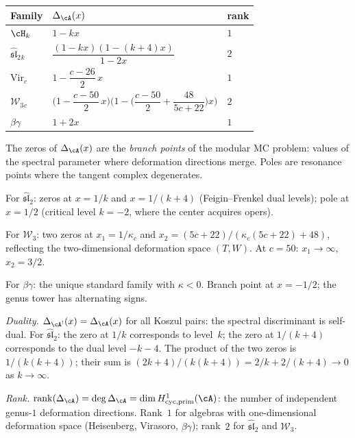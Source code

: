 \begin{computation}
\label{comp:spectral-discriminants-standard}
\begin{center}
\renewcommand{\arraystretch}{1.3}
\begin{tabular}{lll}
\textbf{Family} & $\Delta_\cA(x)$ & rank \\
\hline
$\cH_k$ & $1-kx$ & $1$ \\[2pt]
$\widehat{\mathfrak{sl}}_2{}_k$ &
 $\dfrac{(1-kx)(1-(k{+}4)x)}{1-2x}$ & $2$ \\[6pt]
$\mathrm{Vir}_c$ &
 $1-\dfrac{c-26}{2}\,x$ & $1$ \\[6pt]
$\mathcal W_3{}_c$ &
 $\bigl(1-\dfrac{c-50}{2}\,x\bigr)
 \bigl(1-\bigl(\dfrac{c-50}{2}+\dfrac{48}{5c+22}\bigr)x\bigr)$
 & $2$ \\[6pt]
$\beta\gamma$ & $1+2x$ & $1$
\end{tabular}
\end{center}
The zeros of $\Delta_\cA(x)$ are the \emph{branch points}
of the modular MC problem: values of the spectral parameter
where deformation directions merge. Poles are resonance
points where the tangent complex degenerates.

For $\widehat{\mathfrak{sl}}_2$: zeros at $x=1/k$ and
$x=1/(k{+}4)$ (Feigin--Frenkel dual levels); pole at $x=1/2$
(critical level $k=-2$, where the center acquires opers).

For $\mathcal W_3$: two zeros at $x_1=1/\kappa_c$ and
$x_2=(5c{+}22)/(\kappa_c(5c{+}22){+}48)$, reflecting the
two-dimensional deformation space $(T,W)$. At $c=50$:
$x_1\to\infty$, $x_2=3/2$.

For $\beta\gamma$: the unique standard family with
$\kappa<0$. Branch point at $x=-1/2$; the genus tower has
alternating signs.

\emph{Duality.}
$\Delta_{\cA^!}(x)=\Delta_\cA(x)$ for all Koszul pairs:
the spectral discriminant is self-dual. For
$\widehat{\mathfrak{sl}}_2$: the zero at $1/k$ corresponds
to level~$k$; the zero at $1/(k{+}4)$ corresponds to the
dual level $-k-4$. The product of the two zeros is
$1/(k(k{+}4))$; their sum is $(2k{+}4)/(k(k{+}4))=2/k+2/(k{+}4)
\to 0$ as $k\to\infty$.

\emph{Rank.}
$\operatorname{rank}(\Delta_\cA)
=\deg\Delta_\cA
=\dim H^1_{\mathrm{cyc,prim}}(\cA)$: the number of independent
genus-$1$ deformation directions. Rank~$1$ for algebras with
one-dimensional deformation space (Heisenberg, Virasoro,
$\beta\gamma$); rank~$2$ for $\widehat{\mathfrak{sl}}_2$ and
$\mathcal W_3$.
\end{computation}

